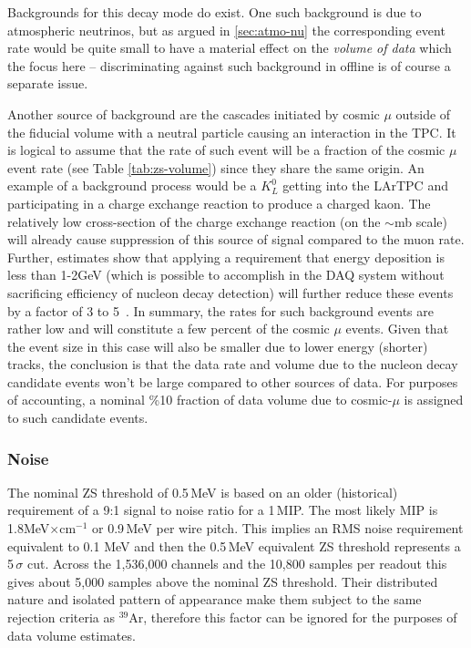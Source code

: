 Backgrounds for this decay mode do exist. One such background is due to atmospheric neutrinos,
but as argued in \ref{sec:atmo-nu} the corresponding event rate would be quite small to have
a material effect on the \textit{volume of data} which the focus here -- discriminating against such
background in offline is of course a separate issue.

Another source of background are the cascades initiated by cosmic $\mu$ outside of the fiducial
volume with a neutral particle causing an interaction in the TPC. It is logical to assume that the rate
of such event will be a fraction of the cosmic $\mu$ event rate (see Table \ref{tab:zs-volume})
since they share the same origin. An example of a background process would be a $K_L^0$ getting
into the LArTPC and participating in a charge exchange reaction to produce a charged kaon.
The relatively low cross-section of the charge exchange reaction (on the $\sim$mb scale) will already cause
suppression of this source of signal compared to the muon rate. Further, estimates show that
applying a requirement that energy deposition is less than 1-2GeV (which is possible to accomplish
in the DAQ system without sacrificing efficiency of nucleon decay detection) will further reduce
these events by a factor of 3 to 5~\cite{kudr_bkgd_pdk}.
In summary, the rates for such background events are rather low and will
constitute a few percent of the cosmic $\mu$ events. Given that the event size in this case
will also be smaller due to lower energy (shorter) tracks, the conclusion is that the data rate
and volume due to the nucleon decay candidate events won't be large compared to
other sources of data. For purposes of accounting, a nominal \%10 fraction of data volume due
to cosmic-$\mu$ is assigned to such candidate events.

\subsubsection{Noise}

The nominal ZS threshold of 0.5\,MeV is based on an older (historical) requirement of a
9:1 signal to noise ratio for a 1\,MIP. The most likely MIP is 1.8MeV$\times$cm$^{-1}$ or 0.9\,MeV
per wire pitch. This implies an RMS noise requirement equivalent to 0.1 MeV and then the 0.5\,MeV
equivalent ZS threshold represents a 5\,$\sigma$ cut. Across the 1,536,000 channels and the
10,800 samples per readout this gives about 5,000 samples above the nominal ZS threshold.
Their distributed nature and isolated pattern of appearance make them subject to the same rejection
criteria as $^{39}$Ar, therefore this factor can be ignored for the purposes of data volume estimates.


